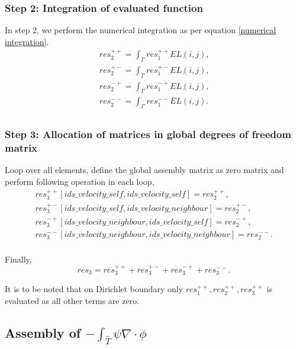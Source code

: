 \documentclass[a4paper,twoside,openright]{book}
\begin{document}
\subsubsection{Step 2: Integration of evaluated function}

In step 2, we perform the numerical integration as per equation \eqref{numerical integration}.
\begin{equation}
\begin{split}
res_2^{++} = \int_{\Gamma} res_1^{++} EL(i,j) \textrm{,}\\
res_2^{+-} = \int_{\Gamma} res_1^{+-} EL(i,j) \textrm{,}\\
res_2^{-+} = \int_{\Gamma} res_1^{-+} EL(i,j) \textrm{,}\\
res_2^{--} = \int_{\Gamma} res_1^{--} EL(i,j) \textrm{.}\\
\end{split}
\end{equation}

\subsubsection{Step 3: Allocation of matrices in global degrees of freedom matrix} 

Loop over all elements, define the global assembly matrix as zero matrix and perform following operation in each loop,
\begin{equation}
\begin{split}
res_3^{++}[ids\_velocity\_self,ids\_velocity\_self] = res_2^{++} \textrm{,}\\
res_3^{+-}[ids\_velocity\_self,ids\_velocity\_neighbour] = res_2^{+-} \textrm{,}\\
res_3^{-+}[ids\_velocity\_neighbour,ids\_velocity\_self] = res_2^{-+} \textrm{,}\\
res_3^{--}[ids\_velocity\_neighbour,ids\_velocity\_neighbour] = res_2^{--} \textrm{.}\\
\end{split}
\end{equation}

Finally,
\begin{equation}
res_3 = res_3^{++} + res_3^{+-} + res_3^{-+} + res_3^{--} \textrm{.}
\end{equation}

It is to be noted that on Dirichlet boundary only $res_1^{++}, res_2^{++}, res_3^{++}$ is evaluated as all other terms are zero.

\subsection{Assembly of $-\int_{\hat{T}} \psi \nabla \cdot \phi$}
\end{document}
